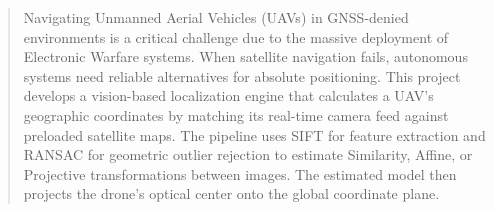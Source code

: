 \begin{abstract}
Navigating Unmanned Aerial Vehicles (UAVs) in GNSS-denied environments is a critical challenge due to the massive deployment of Electronic Warfare systems. When satellite navigation fails, autonomous systems need reliable alternatives for absolute positioning. This project develops a vision-based localization engine that calculates a UAV's geographic coordinates by matching its real-time camera feed against preloaded satellite maps. The pipeline uses SIFT for feature extraction and RANSAC for geometric outlier rejection to estimate Similarity, Affine, or Projective transformations between images. The estimated model then projects the drone's optical center onto the global coordinate plane.
\end{abstract}
